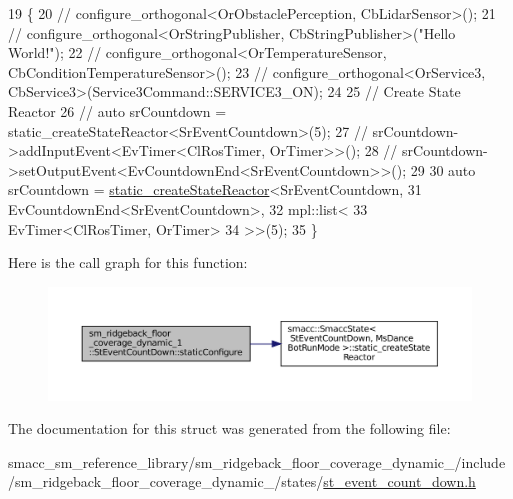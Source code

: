 \begin{DoxyCode}
19     \{
20         \textcolor{comment}{//   configure\_orthogonal<OrObstaclePerception, CbLidarSensor>();}
21         \textcolor{comment}{//   configure\_orthogonal<OrStringPublisher, CbStringPublisher>("Hello World!");}
22         \textcolor{comment}{//   configure\_orthogonal<OrTemperatureSensor, CbConditionTemperatureSensor>();}
23         \textcolor{comment}{//   configure\_orthogonal<OrService3, CbService3>(Service3Command::SERVICE3\_ON);        }
24         
25         \textcolor{comment}{// Create State Reactor}
26         \textcolor{comment}{// auto srCountdown = static\_createStateReactor<SrEventCountdown>(5);        }
27         \textcolor{comment}{// srCountdown->addInputEvent<EvTimer<ClRosTimer, OrTimer>>();}
28         \textcolor{comment}{// srCountdown->setOutputEvent<EvCountdownEnd<SrEventCountdown>>();}
29 
30         \textcolor{keyword}{auto} srCountdown = \hyperlink{classsmacc_1_1SmaccState_a892be704b48f93bf5c35635d1a58ed54}{static\_createStateReactor}<SrEventCountdown, 
31                                                          EvCountdownEnd<SrEventCountdown>, 
32                                                          mpl::list<
33                                                                   EvTimer<ClRosTimer, OrTimer>
34                                                                   >>(5);
35     \}
\end{DoxyCode}
Here is the call graph for this function\+:
\nopagebreak
\begin{figure}[H]
\begin{center}
\leavevmode
\includegraphics[width=350pt]{structsm__ridgeback__floor__coverage__dynamic__1_1_1StEventCountDown_aacf7e164a0dfb240918ff737fd61570d_cgraph}
\end{center}
\end{figure}


The documentation for this struct was generated from the following file\+:\begin{DoxyCompactItemize}
\item 
smacc\+\_\+sm\+\_\+reference\+\_\+library/sm\+\_\+ridgeback\+\_\+floor\+\_\+coverage\+\_\+dynamic\+\_/include/sm\+\_\+ridgeback\+\_\+floor\+\_\+coverage\+\_\+dynamic\+\_/states/\hyperlink{sm__ridgeback__floor__coverage__dynamic__1_2include_2sm__ridgeback__floor__coverage__dynamic__1_026a8bc52390bce786f0a52749687d29}{st\+\_\+event\+\_\+count\+\_\+down.\+h}\end{DoxyCompactItemize}
